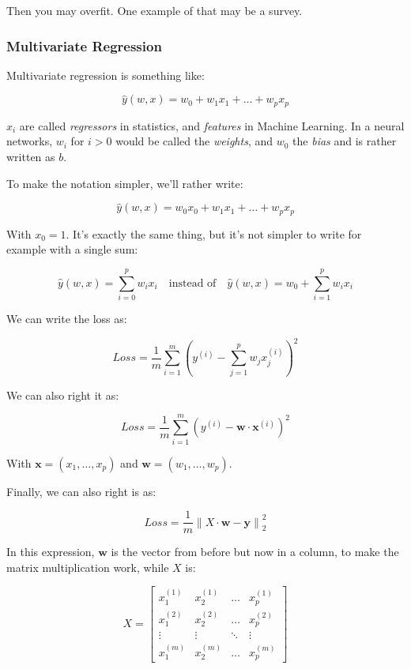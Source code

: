 \documentclass{article}
\theoremstyle{problemstyle}
\begin{document}
Then you may overfit. One example of that may be a survey. 

\subsubsection{Multivariate Regression}

Multivariate regression is something like:

\[
  \hat{y} (w,x) = w_0 + w_1x_1 + \dots + w_p x_p
\]

$x_i$ are called \emph{regressors} in statistics, and \emph{features} in Machine Learning. In a neural networks, $w_i$ for $i > 0$ would be called the \emph{weights}, and $w_0$ the \emph{bias} and is rather written as $b$.

To make the notation simpler, we'll rather write:

\[
  \hat{y} (w,x) = w_0x_0 + w_1x_1 + \dots + w_p x_p
\]

With $x_0 =1$. It's exactly the same thing, but it's not simpler to write for example with a single sum:

\[
  \hat{y} (w,x) = \sum\limits_{i=0}^{p} w_i x_i \quad \text{instead of}  \quad \hat{y} (w,x) = w_0 +  \sum\limits_{i=1}^{p} w_i x_i
\]

We can write the loss as:

\[
  Loss = \frac{1}{m} \sum\limits_{i=1}^{m} \left( y^{(i)} - \sum\limits_{j=1}^{p} w_j x_j^{(i)} \right) ^{2}
\]

We can also right it as:

\[
  Loss = \frac{1}{m} \sum\limits_{i=1}^{m} \left( y^{(i)} - \textbf{w}\cdot \textbf{x}^{(i)} \right) ^{2}
\]

With $\textbf{x} = (x_1, \dots , x_p)$ and $\textbf{w} = (w_1, \dots , w_p)$.

Finally, we can also right is as:

\[
  Loss = \frac{1}{m} \left\lVert X \cdot \textbf{w} - \textbf{y} \right\rVert_2 ^{2}
\]

In this expression, $\textbf{w}$ is the vector from before but now in a column, to make the matrix multiplication work, while $X$ is:

\[
  X =
  \begin{bmatrix}
    x_1^{(1)} & x_2^{(1)} & \dots & x_p^{(1)} \\
    x_1^{(2)} & x_2^{(2)} & \dots & x_p^{(2)} \\
    \vdots    & \vdots    & \ddots& \vdots    \\
    x_1^{(m)} & x_2^{(m)} & \dots & x_p^{(m)}
  \end{bmatrix}
\]
\end{document}
